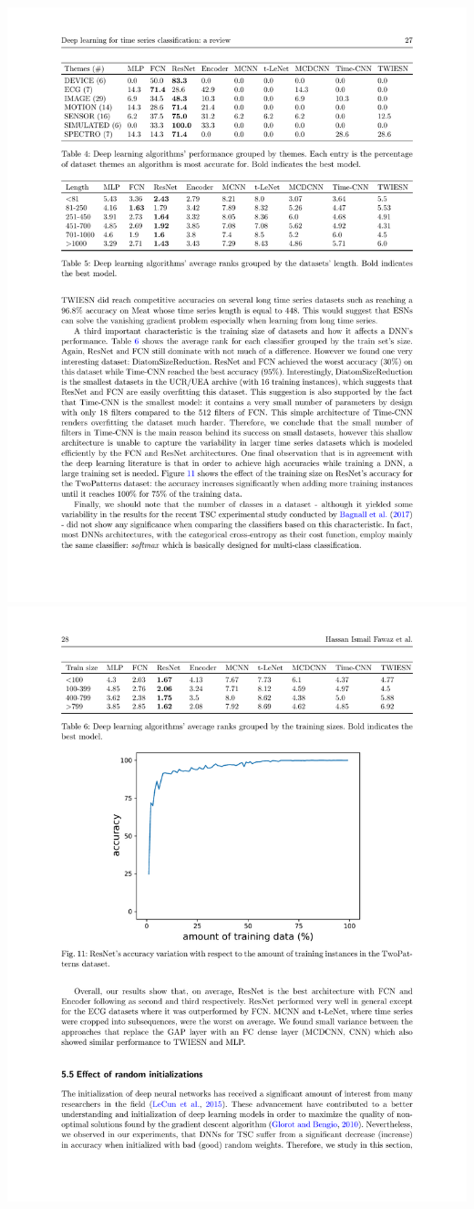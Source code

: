 \documentclass[aspectratio=169]{ctexbeamer}
\begin{document}
\begin{frame}{}
	\begin{center}
		\includegraphics[width=\textwidth]{figure/length}
		\\
		\includegraphics[width=\textwidth]{figure/train_size}

\end{center}
\end{frame}
\end{document}
